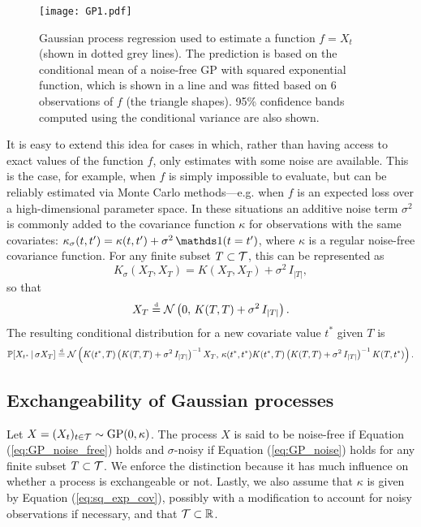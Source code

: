 \begin{figure}[h]
	\centering
	\texttt{[image: GP1.pdf]}
	\caption{Gaussian process regression used to estimate a function $f = X_t$ (shown in dotted grey lines). The prediction is based on the conditional mean of a noise-free GP with squared exponential function, which is shown in a line and was fitted based on 6 observations of $f$ (the triangle shapes). 95\% confidence bands computed using the conditional variance are also shown.}
	\label{fig:GP1}
\end{figure}



It is easy to extend this idea for cases in which, rather than having access to exact values of the function $f$, only estimates with some noise are available. This is the case, for example, when $f$ is simply impossible to evaluate, but can be reliably estimated via Monte Carlo methods---e.g. when $f$ is an expected loss over a high-dimensional parameter space. In these situations an additive noise term $\sigma^2$ is commonly added to the covariance function $\kappa$ for observations with the same covariates: $\kappa_{\sigma} (t, t') = \kappa(t, t') + \sigma^2 \, \indicator (t = t')$, where $\kappa$ is a regular noise-free covariance function. For any finite subset $T \subset \mathcal{T}$, this can be represented as
\begin{equation*}
	K_{\sigma} (X_T, X_T) = K(X_T, X_T) + \sigma^2 \, I_{|T|},
\end{equation*}
so that
\begin{equation} \label{eq:GP_noise}
	X_T \stackrel{\text{\rm\tiny d}}{=} \mathcal{N} \left( 0, \, K(T, T) + \sigma^2 \, I_{|T|} \right).
\end{equation}
The resulting conditional distribution for a new covariate value $t^{*}$ given $T$ is
\begin{equation*}
 \mathbb{P} [X_{t^{*}} \,| \, \sigma X_T ] \stackrel{\text{\rm\tiny d}}{=} \mathcal{N} \left( K(t^{*}, T) \left( K(T, T) + \sigma^2 \, I_{|T|} \right)^{-1} X_T, \, \kappa(t^{*}, t^{*}) K(t^{*}, T) \left( K(T, T) + \sigma^2 \, I_{|T|} \right)^{-1} K(T, t^{*})  \right).
\end{equation*}



\subsection{Exchangeability of Gaussian processes}


Let $X = (X_t)_{t \in \mathcal{T}} \sim \mathrm{GP} (0, \kappa)$. The process $X$ is said to be noise-free if Equation (\ref{eq:GP_noise_free}) holds and $\sigma$-noisy if Equation (\ref{eq:GP_noise}) holds for any finite subset $T \subset \mathcal{T}$. We enforce the distinction because it has much influence on whether a process is exchangeable or not. Lastly, we also assume that $\kappa$ is given by Equation (\ref{eq:sq_exp_cov}), possibly with a modification to account for noisy observations if necessary, and that $\mathcal{T} \subset \mathbb{R}$.



